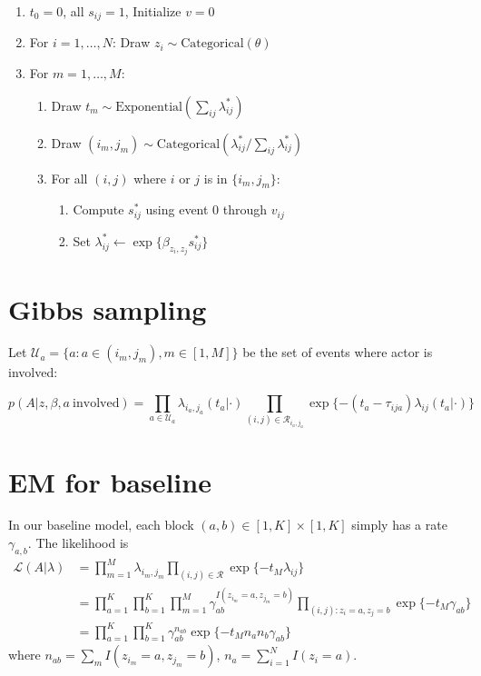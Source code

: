 \documentclass[11pt]{article}
\begin{document}
\begin{enumerate}
\item $t_0 = 0$, all $s_{ij} = 1$, Initialize $v = 0$
\item For $i = 1, \ldots, N$: Draw $z_i \sim \mbox{Categorical}(\theta)$
\item For $m = 1, \ldots, M$:
  \begin{enumerate}
  \item Draw $t_m \sim \mbox{Exponential}\left(\sum_{ij} \lambda_{ij}^*\right)$
  \item Draw $(i_m,j_m) \sim \mbox{Categorical}\left(\lambda_{ij}^* / \sum_{ij}\lambda_{ij}^*\right)$
  \item For all $(i,j)$ where $i$ or $j$ is in $\{i_m,j_m\}$:
    \begin{enumerate}
    \item Compute $s_{ij}^*$ using event $0$ through $v_{ij}$
    \item Set $\lambda_{ij}^* \leftarrow \exp\{ \beta_{z_i,z_j} s_{ij}^*\}$ 
    \end{enumerate}
  \end{enumerate}
\end{enumerate}

\section{Gibbs sampling}

Let $\mathcal{U}_a = \{a: a \in (i_m,j_m), m \in [1,M]\}$ be the set of events where actor is involved:

$$p(A|z,\beta,a \ \mbox{involved}) = \prod_{a \in \mathcal{U}_a} \lambda_{i_a,j_a}(t_a|\cdot)
\prod_{(i,j) \in \mathcal{R}_{i_a,j_a}} \exp \{ -(t_a - \tau_{ija}) \lambda_{ij}(t_a|\cdot)\}$$

\section{EM for baseline}

In our baseline model, each block $(a,b) \in [1,K] \times [1,K]$ simply has a rate $\gamma_{a,b}$.
The likelihood is
\begin{align*}
\mathcal{L}(A|\lambda) &= \prod_{m=1}^M \lambda_{i_m,j_m} \prod_{(i,j) \in \mathcal{R}} \exp\{-t_M\lambda_{ij}\} \\
& =\prod_{a=1}^K \prod_{b=1}^K \prod_{m=1}^M \gamma_{ab}^{I(z_{i_m}=a,z_{j_m}=b)} \prod_{(i,j): z_i=a,z_j=b} \exp\{-t_M\gamma_{ab}\} \\
& =\prod_{a=1}^K\prod_{b=1}^K \gamma_{ab}^{n_{ab}} \exp\{-t_Mn_an_b\gamma_{ab}\}
\end{align*}
where $n_{ab} = \sum_m I(z_{i_m}=a,z_{j_m}=b)$, $n_a = \sum_{i=1}^N I(z_i=a)$.
\end{document}
